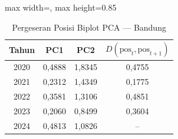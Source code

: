 \begin{table}[H]
\centering
\caption{Pergeseran Posisi Biplot PCA --- Bandung} \label{tab:appjarak_pca_skor_bandung}
\begin{adjustbox}{max width=\textwidth, max height=0.85\textheight}
\begin{tabular}{|c|c|c|c|}
\hline
\textbf{Tahun} & \textbf{PC1} & \textbf{PC2} & \textbf{$D(\text{pos}_t, \text{pos}_{t+1})$} \\
\hline
2020 & 0,4888 & 1,8345 & 0,4755 \\
2021 & 0,2312 & 1,4349 & 0,1775 \\
2022 & 0,3581 & 1,3106 & 0,4851 \\
2023 & 0,2060 & 0,8499 & 0,3604 \\
2024 & 0,4813 & 1,0826 & -- \\
\hline
\end{tabular}
\end{adjustbox}
\end{table}